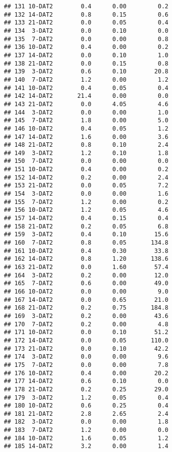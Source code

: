 \documentclass[
]{article}
\begin{document}
\begin{verbatim}
## 131 10-DAT2        0.4      0.00         0.2
## 132 14-DAT2        0.8      0.15         0.6
## 133 21-DAT2        0.0      0.05         0.4
## 134  3-DAT2        0.0      0.10         0.0
## 135  7-DAT2        0.0      0.00         0.8
## 136 10-DAT2        0.4      0.00         0.2
## 137 14-DAT2        0.0      0.10         1.0
## 138 21-DAT2        0.0      0.15         0.8
## 139  3-DAT2        0.6      0.10        20.8
## 140  7-DAT2        1.2      0.00         1.2
## 141 10-DAT2        0.4      0.05         0.4
## 142 14-DAT2       21.4      0.00         0.0
## 143 21-DAT2        0.0      4.05         4.6
## 144  3-DAT2        0.0      0.00         1.0
## 145  7-DAT2        1.8      0.00         5.0
## 146 10-DAT2        0.4      0.05         1.2
## 147 14-DAT2        1.6      0.00         3.6
## 148 21-DAT2        0.8      0.10         2.4
## 149  3-DAT2        1.2      0.10         1.8
## 150  7-DAT2        0.0      0.00         0.0
## 151 10-DAT2        0.4      0.00         0.2
## 152 14-DAT2        0.2      0.00         2.4
## 153 21-DAT2        0.0      0.05         7.2
## 154  3-DAT2        0.0      0.00         1.6
## 155  7-DAT2        1.2      0.00         0.2
## 156 10-DAT2        1.2      0.05         4.6
## 157 14-DAT2        0.4      0.15         0.4
## 158 21-DAT2        0.2      0.05         6.8
## 159  3-DAT2        0.4      0.10        15.6
## 160  7-DAT2        0.8      0.05       134.8
## 161 10-DAT2        0.4      0.30        33.8
## 162 14-DAT2        0.8      1.20       138.6
## 163 21-DAT2        0.0      1.60        57.4
## 164  3-DAT2        0.2      0.00        12.0
## 165  7-DAT2        0.6      0.00        49.0
## 166 10-DAT2        0.0      0.00         9.0
## 167 14-DAT2        0.0      0.65        21.0
## 168 21-DAT2        0.2      0.75       184.8
## 169  3-DAT2        0.2      0.00        43.6
## 170  7-DAT2        0.2      0.00         4.8
## 171 10-DAT2        0.0      0.10        51.2
## 172 14-DAT2        0.0      0.05       110.0
## 173 21-DAT2        0.0      0.10        42.2
## 174  3-DAT2        0.0      0.00         9.6
## 175  7-DAT2        0.0      0.00         7.8
## 176 10-DAT2        0.4      0.00        20.2
## 177 14-DAT2        0.6      0.10         0.0
## 178 21-DAT2        0.2      0.25        29.0
## 179  3-DAT2        1.2      0.05         0.4
## 180 10-DAT2        0.6      0.25         0.4
## 181 21-DAT2        2.8      2.65         2.4
## 182  3-DAT2        0.0      0.00         1.8
## 183  7-DAT2        1.2      0.00         0.0
## 184 10-DAT2        1.6      0.05         1.2
## 185 14-DAT2        3.2      0.00         1.4

\end{verbatim}
\end{document}
